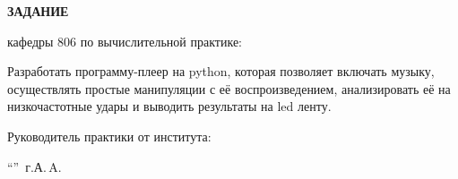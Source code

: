 \begin{center}
\bfseries{\large ЗАДАНИЕ}
\end{center}

кафедры 806 по вычислительной практике:
\par Разработать программу-плеер на python, которая позволяет включать музыку, осуществлять простые манипуляции с её воспроизведением, анализировать её на низкочастотные удары и выводить результаты на led ленту.

\vspace*{\fill}
Руководитель практики от института:

\vspace{5pt}
\enquote{\hspace{0.5cm}}  \the\year\,г. А.\,A. 
\pagebreak
